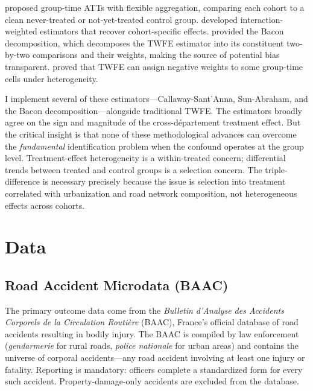 \documentclass[12pt]{article}
\begin{document}
\citet{callaway2021} proposed group-time ATTs with flexible aggregation, comparing each cohort to a clean never-treated or not-yet-treated control group. \citet{sun2021} developed interaction-weighted estimators that recover cohort-specific effects. \citet{goodman2021} provided the Bacon decomposition, which decomposes the TWFE estimator into its constituent two-by-two comparisons and their weights, making the source of potential bias transparent. \citet{dechaisemartin2020} proved that TWFE can assign negative weights to some group-time cells under heterogeneity.

I implement several of these estimators---Callaway-Sant'Anna, Sun-Abraham, and the Bacon decomposition---alongside traditional TWFE. The estimators broadly agree on the sign and magnitude of the cross-d\'{e}partement treatment effect. But the critical insight is that none of these methodological advances can overcome the \textit{fundamental} identification problem when the confound operates at the group level. Treatment-effect heterogeneity is a within-treated concern; differential trends between treated and control groups is a selection concern. The triple-difference is necessary precisely because the issue is selection into treatment correlated with urbanization and road network composition, not heterogeneous effects across cohorts.


\section{Data} \label{sec:data}

\subsection{Road Accident Microdata (BAAC)}

The primary outcome data come from the \textit{Bulletin d'Analyse des Accidents Corporels de la Circulation Routi\`{e}re} (BAAC), France's official database of road accidents resulting in bodily injury. The BAAC is compiled by law enforcement (\textit{gendarmerie} for rural roads, \textit{police nationale} for urban areas) and contains the universe of corporal accidents---any road accident involving at least one injury or fatality. Reporting is mandatory: officers complete a standardized form for every such accident. Property-damage-only accidents are excluded from the database.
\end{document}

